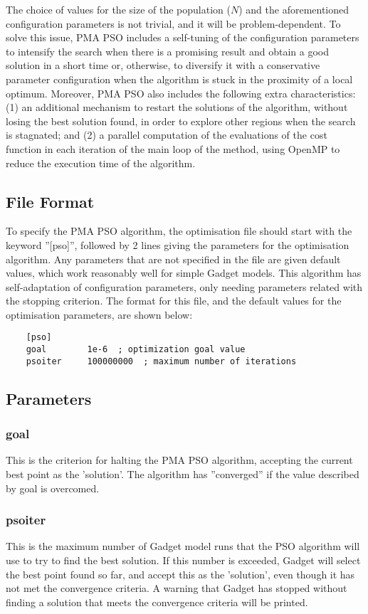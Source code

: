 \documentclass[10pt,twoside]{book}
\begin{document}
The choice of values for the size of the population ($N$) and the aforementioned configuration parameters is not trivial, and it will be problem-dependent. To solve this issue, PMA PSO includes a self-tuning of the configuration parameters to intensify the search when there is a promising result and obtain a good solution in a short time or, otherwise, to diversify it with a conservative parameter configuration when the algorithm is stuck in the proximity of a local optimum. Moreover, PMA PSO also includes the following extra characteristics: (1) an additional mechanism to restart the solutions of the algorithm, without losing the best solution found, in order to explore other regions when the search is stagnated; and (2) a parallel computation of the evaluations of the cost function in each iteration of the main loop of the method, using OpenMP to reduce the execution time of the algorithm. 


\subsection{File Format}\label{subsec:psofile}
To specify the PMA PSO algorithm, the optimisation file should start with the keyword ''[pso]'', followed by 2 lines giving the parameters for the optimisation algorithm.  Any parameters that are not specified in the file are given default values, which work reasonably well for simple Gadget models.  This algorithm has self-adaptation of configuration parameters, only needing parameters related with the stopping criterion. The format for this file, and the default values for the optimisation parameters, are shown below:

{\small\begin{verbatim}
	[pso]
	goal        1e-6  ; optimization goal value
	psoiter     100000000  ; maximum number of iterations
	\end{verbatim}}

\subsection{Parameters}\label{subsec:psopar}
\subsubsection{goal}
This is the criterion for halting the PMA PSO algorithm, accepting the current best point as the 'solution'.  The algorithm has ''converged'' if the value described by goal is overcomed.
\subsubsection{psoiter}
This is the maximum number of Gadget model runs that the PSO algorithm will use to try to find the best solution.  If this number is exceeded, Gadget will select the best point found so far, and accept this as the 'solution', even though it has not met the convergence criteria.  A warning that Gadget has stopped without finding a solution that meets the convergence criteria will be printed.
\end{document}
